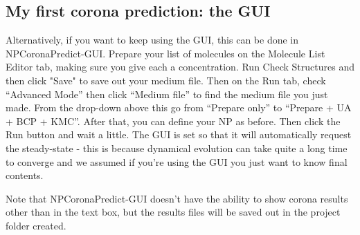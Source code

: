 \documentclass[10pt,a4paper,onecolumn]{report}
\begin{document}
\subsection{My first corona prediction: the GUI} \label{section:firstCoronaGUI}

Alternatively, if you want to keep using the GUI, this can be done in NPCoronaPredict-GUI. Prepare your list of molecules on the Molecule List Editor tab, making sure you give each a concentration. 
Run Check Structures and then click "Save" to save out your medium file.
 Then on the Run tab, check ``Advanced Mode'' then click ``Medium file'' to find the medium file you just made. 
From the drop-down above this go from ``Prepare only'' to ``Prepare + UA + BCP + KMC''. After that, you can define your NP as before. Then click the Run button and wait a little.
The GUI is set so that it will automatically request the steady-state - this is because dynamical evolution can take quite a long time to converge and we assumed if you're using the GUI you just want to know final contents.



Note that NPCoronaPredict-GUI doesn't have the ability to show corona results other than in the text box, but the results files will be saved out in the project folder created.
\end{document}
